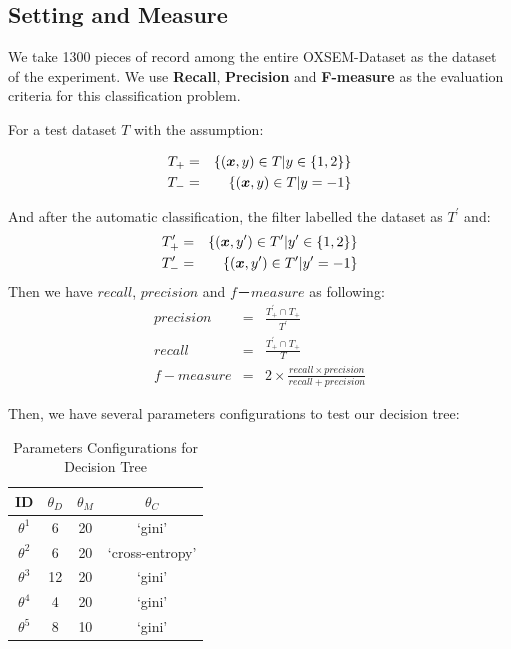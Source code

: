 \subsection{Setting and Measure}
We take 1300 pieces of record among the entire OXSEM-Dataset as the dataset of the experiment. We use \textbf{Recall}, \textbf{Precision} and \textbf{F-measure} as the evaluation criteria for this classification problem.

\begin{defn}
For a test dataset $T$ with the assumption:

\begin{eqnarray}
	T_+ &=& \{(\boldsymbol{x}, y) \in T \vert y\in \{1,2\} \}\\
	T_- &=& \{(\boldsymbol{x}, y) \in T \vert y=-1\}
\end{eqnarray}

And after the automatic classification, the filter labelled the dataset as $T^\prime$ and:
\begin{eqnarray}
	T^\prime_+ &=& \{(\boldsymbol{x}, y^\prime) \in T^\prime \vert y^\prime\in \{1,2\} \}\\
	T^\prime_- &=& \{(\boldsymbol{x}, y^\prime) \in T^\prime \vert y^\prime=-1\}
\end{eqnarray}
Then we have $recall$, $precision$ and $f－measure$ as following:
\begin{eqnarray}
	precision &=& \frac{T^\prime_+ \cap T_+ }{T^\prime} \\
	recall &=& \frac{T^\prime_+ \cap T_+ }{T} \\
	f-measure &=& 2\times \frac{recall \times precision}{recall + precision} 
\end{eqnarray}
\end{defn}

Then, we have several parameters configurations to test our decision tree:
\begin{table}[htb!]
\small
\centering
\caption{Parameters Configurations for Decision Tree}
\label{tab:exp:para}
\begin{tabular}{@{}cccc@{}}
\toprule
\textbf{ID} & $\theta_D$ & $\theta_M$ & $\theta_C$ \\ \midrule
$\theta^1$ 
	& 6
	& 20
	& `gini' \\ \midrule
$\theta^2$ 
	& 6
	& 20
	& `cross-entropy' \\ \midrule
$\theta^3$ 
	& 12
	& 20
	& `gini'\\ \midrule
$\theta^4$ 
	& 4
	& 20
	& `gini'\\ \midrule
$\theta^5$ 
	& 8
	& 10
	& `gini'\\
	 \bottomrule
\end{tabular}
\end{table}

